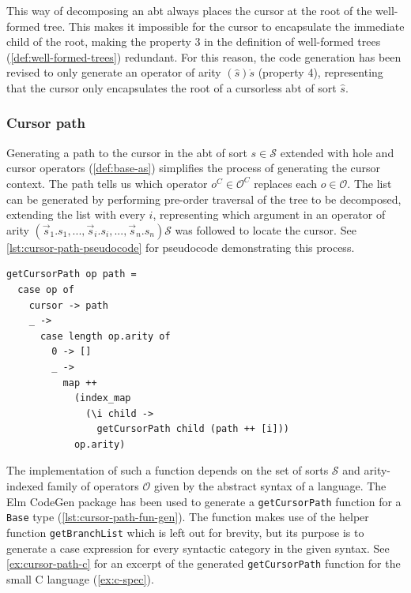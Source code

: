 This way of decomposing an abt always places the cursor at the root of the
well-formed tree. This makes it impossible for the cursor to encapsulate the immediate
child of the root, making the property 3 in the definition of well-formed trees
(\cref{def:well-formed-trees}) redundant. For this reason, the code generation
has been revised to only generate an operator of arity $(\hat{s})\dot{s}$ (property 4),
representing that the cursor only encapsulates the root of a cursorless abt
of sort $\hat{s}$.

\subsubsection{Cursor path}

Generating a path to the cursor in the abt of sort $s \in \mathcal{S}$ extended with
hole and cursor operators (\cref{def:base-as})
simplifies the process of generating the cursor context. The path tells us
which operator $o^C \in \mathcal{O}^C$ replaces each $o \in \mathcal{O}$.
The list can be generated by performing pre-order traversal of the tree to be decomposed,
extending the list with every $i$, representing which argument in an operator of
arity $(\vec{s}_1.s_1, ... , \vec{s}_i.s_i, ..., \vec{s}_n.s_n)\mathcal{S}$ was
followed to locate the cursor. See \cref{lst:cursor-path-pseudocode} for pseudocode
demonstrating this process.

\begin{lstlisting}[caption={Pseudocode for generating cursor path},label={lst:cursor-path-pseudocode},
  style=inline]
getCursorPath op path =
  case op of
    cursor -> path
    _ -> 
      case length op.arity of
        0 -> []
        _ -> 
          map ++ 
            (index_map 
              (\i child -> 
                getCursorPath child (path ++ [i])) 
            op.arity)

\end{lstlisting}

The implementation of such a function depends on the set of sorts $\mathcal{S}$
and arity-indexed family of operators $\mathcal{O}$ given by the abstract syntax
of a language. The Elm CodeGen package\cite{elm-codegen-package} has been used to
generate a \texttt{getCursorPath} function for a \texttt{Base} type (\cref{lst:cursor-path-fun-gen}).
The function makes use of the helper function
\texttt{getBranchList} which is left out for brevity, but its purpose is
to generate a case expression for every syntactic category in the given syntax.
See \cref{ex:cursor-path-c} for an excerpt of the generated \texttt{getCursorPath}
function for the small C language (\cref{ex:c-spec}).

